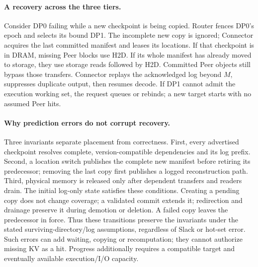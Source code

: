 \paragraph{A recovery across the three tiers.}
Consider DP0 failing while a new checkpoint is being copied. Router fences
DP0's epoch and selects its bound DP1. The incomplete new copy is ignored;
Connector acquires the last committed manifest and leases its locations.
If that checkpoint is in DRAM, missing Peer blocks use H2D. If its whole
manifest has already moved to storage, they use storage reads followed by
H2D. Committed Peer objects still bypass those transfers. Connector
replays the acknowledged log beyond $M$, suppresses duplicate output,
then resumes decode. If DP1 cannot admit the execution working set, the
request queues or rebinds; a new target starts with no assumed Peer hits.

\paragraph{Why prediction errors do not corrupt recovery.}
Three invariants separate placement from correctness. First, every
advertised checkpoint resolves complete, version-compatible dependencies
and its log prefix. Second, a location switch publishes the complete new
manifest before retiring its predecessor; removing the last copy first
publishes a logged reconstruction path. Third, physical memory is released
only after dependent transfers and readers drain. The initial log-only
state satisfies these conditions. Creating a pending copy does not change
coverage; a validated commit extends it; redirection and drainage preserve
it during demotion or deletion. A failed copy leaves the predecessor in
force. Thus these transitions preserve the invariants under the stated
surviving-directory/log assumptions, regardless of Slack or hot-set error.
Such errors can add waiting, copying or recomputation; they cannot authorize
missing KV as a hit. Progress additionally requires a compatible target
and eventually available execution/I/O capacity.
